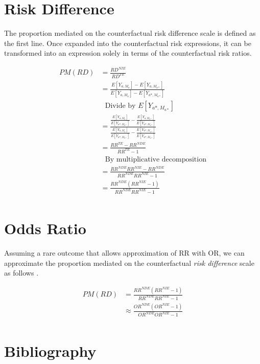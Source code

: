 \documentclass[dvipdfmx,10pt]{article}
\date{\today}
\title{}
\begin{document}
\sloppy
\section{Risk Difference}
\label{sec:orgdd0e7a0}

The proportion mediated on the counterfactual risk difference scale is defined as the first line. Once expanded into the counterfactual risk expressions, it can be transformed into an expression solely in terms of the counterfactual risk ratios.

\begin{align*}
  PM(RD)
  &= \frac{RD^{NIE}}{RD^{TE}}\\
  &= \frac{E[Y_{a,M_{a}}] - E[Y_{a,M_{a*}}]}{E[Y_{a,M_{a}}] - E[Y_{a*,M_{a*}}]}\\
  &~~~\text{Divide by }E[Y_{a*,M_{a*}}]\\
  &= \frac{\frac{E[Y_{a,M_{a}}]}{E[Y_{a*,M_{a*}}]} - \frac{E[Y_{a,M_{a*}}]}{E[Y_{a*,M_{a*}}]}}{\frac{E[Y_{a,M_{a}}]}{E[Y_{a*,M_{a*}}]} - \frac{E[Y_{a*,M_{a*}}]}{E[Y_{a*,M_{a*}}]}}\\
  &= \frac{RR^{TE} - RR^{NDE}}{RR^{TE}-1}\\
  &~~~\text{By multiplicative decomposition}\\
  &= \frac{RR^{NDE}RR^{NIE} - RR^{NDE}}{RR^{NDE}RR^{NIE}-1}\\
  &= \frac{RR^{NDE}(RR^{NIE} - 1)}{RR^{NDE}RR^{NIE}-1}\\
\end{align*}


\section{Odds Ratio}
\label{sec:org7ae43bc}

Assuming a rare outcome that allows approximation of RR with OR, we can approximate the proportion mediated on the counterfactual \emph{risk difference} scale as follows \cite{vanderweeleOddsRatiosMediation2010}.

\begin{align*}
  PM(RD)
  &= \frac{RR^{NDE}(RR^{NIE} - 1)}{RR^{NDE}RR^{NIE}-1}\\
  &\approx \frac{OR^{NDE}(OR^{NIE} - 1)}{OR^{NDE}OR^{NIE}-1}\\
\end{align*}

\section{Bibliography}
\label{sec:org842f339}
\renewcommand{\section}[2]{}



\end{document}
